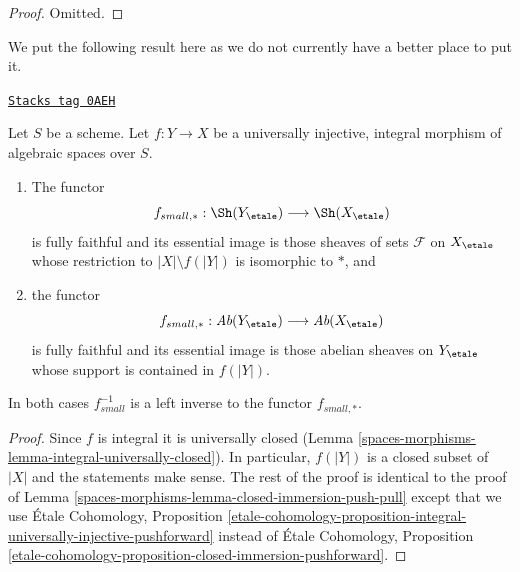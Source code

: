 \begin{proof}
Omitted.
\end{proof}

We put the following result here as we do not currently have a better
place to put it.

\begin{lemma}
\label{spaces-morphisms-lemma-integral-universally-injective-push-pull}
\href{https://stacks.math.columbia.edu/tag/0AEH}{\texttt{Stacks tag 0AEH}}

Let $S$ be a scheme. Let $f : Y \to X$ be a universally injective,
integral morphism of algebraic spaces over $S$.
\begin{enumerate}
\item The functor
$$
f_{small, *} : \Sh(Y_\etale) \longrightarrow \Sh(X_\etale)
$$
is fully faithful and its essential image is those sheaves of sets
$\mathcal{F}$ on $X_\etale$ whose restriction to $|X| \setminus f(|Y|)$
is isomorphic to $*$, and
\item the functor
$$
f_{small, *} : \textit{Ab}(Y_\etale) \longrightarrow \textit{Ab}(X_\etale)
$$
is fully faithful and its essential image is those abelian sheaves on
$Y_\etale$ whose support is contained in $f(|Y|)$.
\end{enumerate}
In both cases $f_{small}^{-1}$ is a left inverse to the functor $f_{small, *}$.
\end{lemma}

\begin{proof}
Since $f$ is integral it is universally closed
(Lemma \ref{spaces-morphisms-lemma-integral-universally-closed}).
In particular, $f(|Y|)$ is a closed subset of $|X|$
and the statements make sense.
The rest of the proof is identical to the proof of
Lemma \ref{spaces-morphisms-lemma-closed-immersion-push-pull}
except that we use
\'Etale Cohomology, Proposition
\ref{etale-cohomology-proposition-integral-universally-injective-pushforward}
instead of
\'Etale Cohomology, Proposition
\ref{etale-cohomology-proposition-closed-immersion-pushforward}.
\end{proof}



